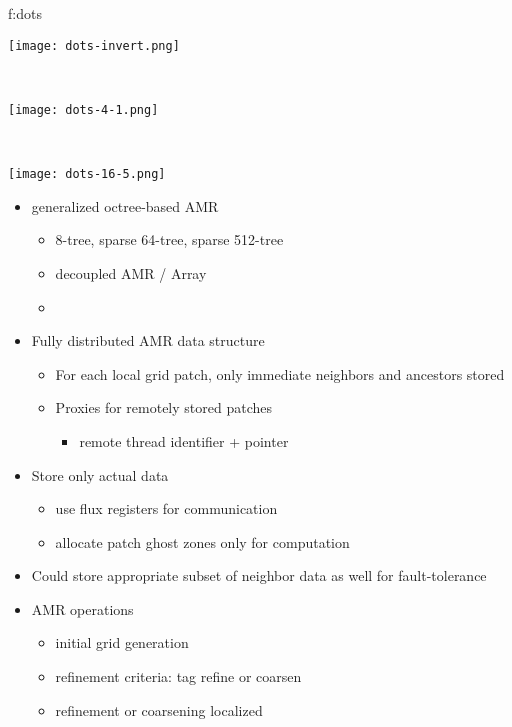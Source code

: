 \documentclass[14pt,letter]{article}
\begin{document}
{f:dots}{
\begin{minipage}{7.0in}
\begin{minipage}{2.2in}
\texttt{[image: dots-invert.png]}
\end{minipage} \ 
\begin{minipage}{2.2in}
\texttt{[image: dots-4-1.png]}
\end{minipage} \ 
\begin{minipage}{2.2in}
\texttt{[image: dots-16-5.png]}
\end{minipage}
\end{minipage}}

\begin{itemize}
\item generalized octree-based AMR 
  \begin{itemize}
  \item 8-tree, sparse 64-tree, sparse 512-tree
  \item decoupled AMR / Array
  \item 
  \end{itemize}
\item Fully distributed AMR data structure
  \begin{itemize}
\item For each local grid patch, only immediate neighbors and
  ancestors stored
  \item Proxies for remotely stored patches
    \begin{itemize}
    \item remote thread identifier + pointer
    \end{itemize}
  \end{itemize}
\item Store only actual data
  \begin{itemize}
  \item use flux registers for communication
  \item allocate patch ghost zones only for computation
  \end{itemize}
\item Could store appropriate subset of neighbor data as well for
  fault-tolerance
\item AMR operations
  \begin{itemize}
  \item initial grid generation
  \item refinement criteria: tag refine or coarsen
  \item refinement or coarsening localized
  \end{itemize}
\end{itemize}
\end{document}
